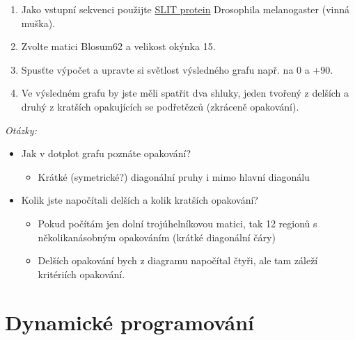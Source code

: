 \documentclass[11pt]{article}
\begin{document}
\begin{enumerate}
\item Jako vstupní sekvenci použijte \href{data/dotlet\_rep.txt}{SLIT protein} Drosophila melanogaster (vinná
muška).
\item Zvolte matici Blosum62 a velikost okýnka 15.
\item Spusťte výpočet a upravte si světlost výsledného grafu např. na 0 a +90.
\item Ve výsledném grafu by jste měli spatřit dva shluky, jeden tvořený z delších a
druhý z kratších opakujících se podřetězců (zkráceně opakování).
\end{enumerate}

\emph{Otázky:}
\begin{itemize}
\item Jak v dotplot grafu poznáte opakování?
\begin{itemize}
\item Krátké (symetrické?) diagonální pruhy i mimo hlavní diagonálu
\end{itemize}
\item Kolik jste napočítali delších a kolik kratších opakování?
\begin{itemize}
\item Pokud počítám jen dolní trojúhelníkovou matici, tak 12 regionů s
několikanásobným opakováním (krátké diagonální čáry)
\item Delších opakování bych z diagramu napočítal čtyři, ale tam záleží kritériích
opakování.
\end{itemize}
\end{itemize}

\section{Dynamické programování}
\label{sec:orga86e45f}
\end{document}
